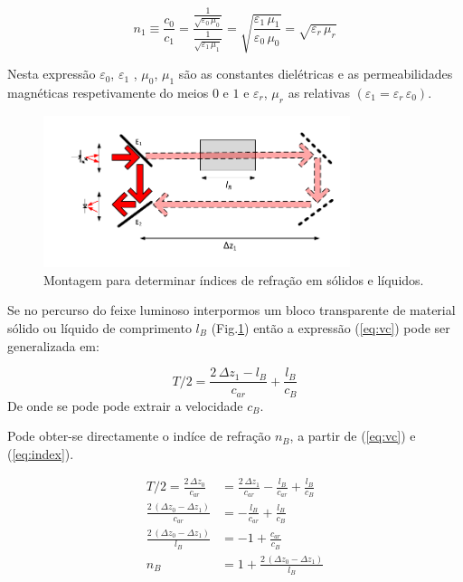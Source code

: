 \documentclass[a4paper,12pt]{article}      %
\begin{document}
 \begin{equation}
	\label{eq:index}
	n_1 \equiv \frac{c_0}{c_1}  = \frac{\frac{1}{\sqrt{\varepsilon_0 \, \mu_0}} }{\frac{1}{\sqrt{\varepsilon_1 \, \mu_1}} } =
		\sqrt{\frac{\varepsilon_1 \, \mu_1}{\varepsilon_0 \, \mu_0}} = \sqrt{\varepsilon_r \, \mu_r}
\end{equation}

Nesta expressão $\varepsilon_0$, $\varepsilon_1$ ,	 $\mu_0$, $\mu_1$ são as constantes dielétricas e as permeabilidades magnéticas respetivamente do meios $0$ e $1$ e $\varepsilon_r$, $\mu_r$    as relativas $(\varepsilon_1= \varepsilon_r\, \varepsilon_0)$.

\begin{figure}[h!tb]  
	\centering 
	\includegraphics[width=0.8\textwidth]{Vel_esquema_bloco}
	\caption{Montagem para determinar índices de refração em sólidos e líquidos. \label{fig:Montagem_bloco}} 
\end{figure}

Se no percurso do feixe luminoso interpormos um bloco transparente de material sólido ou líquido  
 de comprimento $l_B$ (Fig.\ref{fig:Montagem_bloco}) então a expressão  (\ref{eq:vc}) pode ser generalizada em:

\begin{equation}
	\label{eq:vc_bloco}
	{T/2}  = \frac{2\,\Delta z_1 - l_B}{c_{ar}}  +  \frac{l_B}{c_{B}}
\end{equation}
De onde se pode pode extrair a velocidade $c_{B}$. 

Pode obter-se directamente o indíce de refração $n_{B}$, a partir de (\ref{eq:vc}) e (\ref{eq:index}).

\begin{align}
	\label{eq:n_bloco}
	{T/2}  = \frac{2\,\Delta z_0}{c_{ar}}  &=  \frac{2\,\Delta z_1 }{c_{ar}} -   \frac{l_B}{c_{ar}}  +  \frac{l_B}{c_{B}} \nonumber \\ 
	\frac{2\,(\Delta z_0- \Delta z_1 )}{c_{ar}}  &= -   \frac{l_B}{c_{ar}}  +  \frac{l_B}{c_{B}} \nonumber \\
	\frac{2\,(\Delta z_0- \Delta z_1 )}{l_B} &= -1 +  \frac{c_{ar}}{c_{B}} \nonumber \\
	n_{B} &= 1 +  \frac{2\,(\Delta z_0- \Delta z_1 )}{l_B} 
\end{align}
\end{document}
